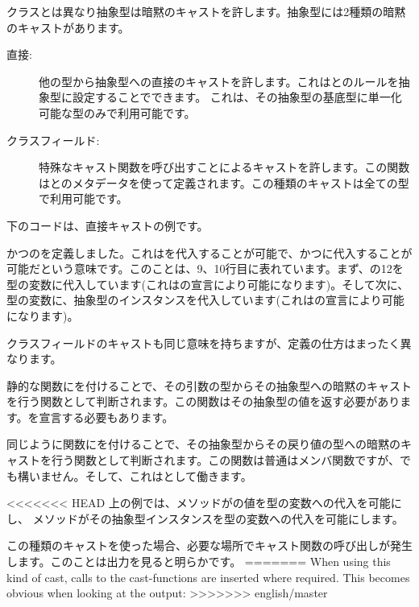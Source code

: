 クラスとは異なり抽象型は暗黙のキャストを許します。抽象型には2種類の暗黙のキャストがあります。

\begin{description}
	\item[直接:] 他の型から抽象型への直接のキャストを許します。これはとのルールを抽象型に設定することでできます。 これは、その抽象型の基底型に単一化可能な型のみで利用可能です。
	\item[クラスフィールド:] 特殊なキャスト関数を呼び出すことによるキャストを許します。この関数はとのメタデータを使って定義されます。この種類のキャストは全ての型で利用可能です。
\end{description}

下のコードは、直接キャストの例です。


かつのを定義しました。これはを代入することが可能で、かつに代入することが可能だという意味です。このことは、9、10行目に表れています。まず、の12を型の変数に代入しています(これはの宣言により可能になります)。そして次に、型の変数に、抽象型のインスタンスを代入しています(これはの宣言により可能になります)。

クラスフィールドのキャストも同じ意味を持ちますが、定義の仕方はまったく異なります。


静的な関数にを付けることで、その引数の型からその抽象型への暗黙のキャストを行う関数として判断されます。この関数はその抽象型の値を返す必要があります。を宣言する必要もあります。

同じように関数にを付けることで、その抽象型からその戻り値の型への暗黙のキャストを行う関数として判断されます。この関数は普通はメンバ関数ですが、でも構いません。そして、これはとして働きます。

<<<<<<< HEAD
上の例では、メソッドがの値を型の変数への代入を可能にし、
メソッドがその抽象型インスタンスを型の変数への代入を可能にします。

この種類のキャストを使った場合、必要な場所でキャスト関数の呼び出しが発生します。このことは出力を見ると明らかです。
=======
When using this kind of cast, calls to the cast-functions are inserted where required. This becomes obvious when looking at the  output:
>>>>>>> english/master

